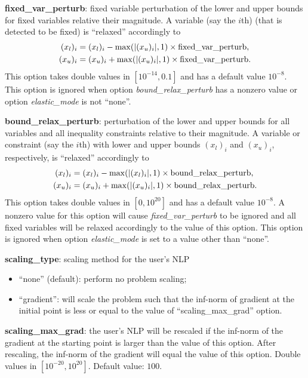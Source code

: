 \noindent \textbf{fixed\_var\_perturb}: fixed variable perturbation of the lower and upper bounds for fixed variables relative their  magnitude. A variable (say the $i$th) (that is detected to be fixed) is ``relaxed'' accordingly to 
\begin{align*}
(x_l)_i & =  (x_l)_i -  \max(|(x_u)_i|,1) \times \textnormal{fixed\_var\_perturb}, \\
(x_u)_i & =  (x_u)_i +  \max(|(x_u)_i|,1) \times \textnormal{fixed\_var\_perturb}.
\end{align*}
This option takes double values in $[10^{-14}, 0.1]$ and has a default value $10^{-8}$. This option is ignored when option \textit{bound\_relax\_perturb} has a nonzero value or option \textit{elastic\_mode} is not ``none''.
\medskip

\noindent \textbf{bound\_relax\_perturb}: perturbation of the lower and upper bounds for all variables and all inequality constraints relative to their magnitude. A variable or constraint (say the $i$th) with lower and upper bounds $(x_l)_i$ and $(x_u)_i$, respectively,  is ``relaxed'' accordingly to 
\begin{align*}
(x_l)_i & =  (x_l)_i -  \max(|(x_l)_i|,1) \times \textnormal{bound\_relax\_perturb}, \\
(x_u)_i & =  (x_u)_i +  \max(|(x_u)_i|,1) \times \textnormal{bound\_relax\_perturb}.
\end{align*}
This option takes double values in $[0, 10^{20}]$ and has a default value $10^{-8}$. A nonzero value for this option will cause \textit{fixed\_var\_perturb} to be ignored and all fixed variables will be relaxed accordingly to the value of this option. This option is ignored when option \textit{elastic\_mode} is set to a value other than ``none''.
\medskip

\noindent \textbf{scaling\_type}: scaling method for the user's NLP
\begin{itemize}
\item ``none'' (default): perform no problem scaling;
\item ``gradient'':  will scale the problem such that the inf-norm of gradient at the initial point is less or equal to the value of ``scaling\_max\_grad'' option.
\end{itemize}
\medskip

\noindent \textbf{scaling\_max\_grad}: the user's NLP will be rescaled if the inf-norm of the gradient at the starting point is larger than the value of this option. After rescaling, the inf-norm of the gradient will equal the value of this option. Double values in $[10^{-20}, 10^{20}]$. Default value: $100$.
\medskip

